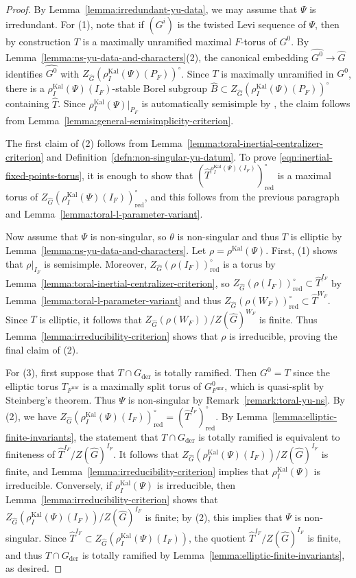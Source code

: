 \documentclass[reqno]{amsart}
\numberwithin{equation}{subsection}
\newcommand{\wh}[1]{\widehat{#1}}
\DeclareMathOperator{\unr}{unr}
\DeclareMathOperator{\red}{red}
\DeclareMathOperator{\Kal}{Kal}
\DeclareMathOperator{\der}{der}
\theoremstyle{remark}
\numberwithin{equation}{subsection}
\numberwithin{figure}{subsection}
\begin{document}
\begin{proof}
By Lemma~\ref{lemma:irredundant-yu-data}, we may assume that $\Psi$ is irredundant. For (1), note that if $(G^i)$ is the twisted Levi sequence of $\Psi$, then by construction $T$ is a maximally unramified maximal $F$-torus of $G^0$. By Lemma~\ref{lemma:ns-yu-data-and-characters}(2), the canonical embedding $\wh{G^0} \to \wh G$ identifies $\wh{G^0}$ with $Z_{\wh G}(\rho_I^{\Kal}(\Psi)(P_F))^\circ$. Since $T$ is maximally unramified in $G^0$, there is a $\rho_I^{\Kal}(\Psi)(I_F)$-stable Borel subgroup $\wh B \subset Z_{\wh G}(\rho_I^{\Kal}(\Psi)(P_F))^\circ$ containing $\wh T$. Since $\rho_I^{\Kal}(\Psi)|_{P_F}$ is automatically semisimple by \cite[Lemma 2.6]{BMR05}, the claim follows from Lemma~\ref{lemma:general-semisimplicity-criterion}.

The first claim of (2) follows from Lemma~\ref{lemma:toral-inertial-centralizer-criterion} and Definition~\ref{defn:non-singular-yu-datum}. To prove \eqref{eqn:inertial-fixed-points-torus}, it is enough to show that $(\wh T^{\rho_I^{\Kal}(\Psi)(I_F)})^\circ_{\red}$ is a maximal torus of $Z_{\wh G}(\rho_I^{\Kal}(\Psi)(I_F))^\circ_{\red}$, and this follows from the previous paragraph and Lemma~\ref{lemma:toral-l-parameter-variant}.

Now assume that $\Psi$ is non-singular, so $\theta$ is non-singular and thus $T$ is elliptic by Lemma~\ref{lemma:ns-yu-data-and-characters}. Let $\rho = \rho^{\Kal}(\Psi)$. First, (1) shows that $\rho|_{I_F}$ is semisimple. Moreover, $Z_{\wh G}(\rho(I_F))^\circ_{\red}$ is a torus by Lemma~\ref{lemma:toral-inertial-centralizer-criterion}, so $Z_{\wh G}(\rho(I_F))^\circ_{\red} \subset \wh T^{I_F}$ by Lemma~\ref{lemma:toral-l-parameter-variant} and thus $Z_{\wh G}(\rho(W_F))^\circ_{\red} \subset \wh T^{W_F}$. Since $T$ is elliptic, it follows that $Z_{\wh G}(\rho(W_F))/Z(\wh G)^{W_F}$ is finite.
Thus Lemma~\ref{lemma:irreducibility-criterion} shows that $\rho$ is irreducible, proving the final claim of (2).

For (3), first suppose that $T \cap G_{\der}$ is totally ramified. Then $G^0 = T$ since the elliptic torus $T_{F^{\unr}}$ is a maximally split torus of $G^0_{F^{\unr}}$, which is quasi-split by Steinberg's theorem. Thus $\Psi$ is non-singular by Remark~\ref{remark:toral-yu-ns}. By (2), we have $Z_{\wh G}(\rho_I^{\Kal}(\Psi)(I_F))^\circ_{\red}=(\wh T^{I_F})^\circ_{\red}$. By Lemma~\ref{lemma:elliptic-finite-invariants}, the statement that $T\cap G_{\der}$ is totally ramified is equivalent to finiteness of $\wh T^{I_F}/Z(\wh G)^{I_F}$. It follows that $Z_{\wh G}(\rho_I^{\Kal}(\Psi)(I_F))/Z(\wh G)^{I_F}$ is finite, and Lemma~\ref{lemma:irreducibility-criterion} implies that $\rho_I^{\Kal}(\Psi)$ is irreducible. Conversely, if $\rho_I^{\Kal}(\Psi)$ is irreducible, then Lemma~\ref{lemma:irreducibility-criterion} shows that $Z_{\wh G}(\rho_I^{\Kal}(\Psi)(I_F))/Z(\wh G)^{I_F}$ is finite; by (2), this implies that $\Psi$ is non-singular. Since $\wh T^{I_F}\subset Z_{\wh G}(\rho_I^{\Kal}(\Psi)(I_F))$, the quotient $\wh T^{I_F}/Z(\wh G)^{I_F}$ is finite, and thus $T \cap G_{\der}$ is totally ramified by Lemma~\ref{lemma:elliptic-finite-invariants}, as desired.
\end{proof}
\end{document}
